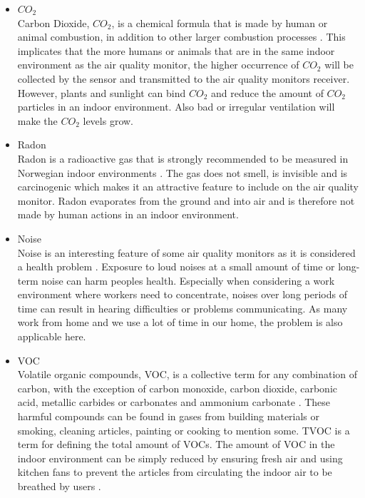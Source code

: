 \begin{itemize}
    \item \(CO_2\)\\
        Carbon Dioxide, \(CO_2\), is a chemical formula that is made by human or animal combustion, in addition to other larger combustion processes \cite{CO2}. This implicates that the more humans or animals that are in the same indoor environment as the air quality monitor, the higher occurrence of \(CO_2\) will be collected by the sensor and transmitted to the air quality monitors receiver. However, plants and sunlight can bind \(CO_2\) and reduce the amount of \(CO_2\) particles in an indoor environment. Also bad or irregular ventilation will make the \(CO_2\) levels grow. \\
    \item Radon\\
        Radon is a radioactive gas that is strongly recommended to be measured in Norwegian indoor environments \cite{Radon}. The gas does not smell, is invisible and is carcinogenic which makes it an attractive feature to include on the air quality monitor. Radon evaporates from the ground and into air and is therefore not made by human actions in an indoor environment.\\
    \item Noise\\
        Noise is an interesting feature of some air quality monitors as it is considered a health problem \cite{Noise}. Exposure to loud noises at a small amount of time or long-term noise can harm peoples health. Especially when considering a work environment where workers need to concentrate, noises over long periods of time can result in hearing difficulties or problems communicating. As many work from home and we use a lot of time in our home, the problem is also applicable here. \\
    \item VOC\\
        Volatile organic compounds, VOC, is a collective term for any combination of carbon, with the exception of carbon monoxide, carbon dioxide, carbonic acid, metallic carbides or carbonates and ammonium carbonate \cite{VOC}. These harmful compounds can be found in gases from building materials or smoking, cleaning articles, painting or cooking to mention some. TVOC is a term for defining the total amount of VOCs. The amount of VOC in the indoor environment can be simply reduced by ensuring fresh air and using kitchen fans to prevent the articles from circulating the indoor air to be breathed by users \cite{RecommendedIAQ}.\\

\end{itemize}
